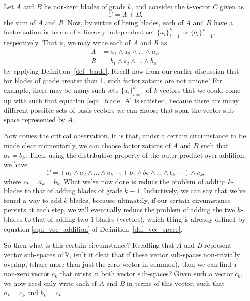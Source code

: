 \documentclass[12pt]{article}
\numberwithin{equation}{section}
\newcommand{\V}{\mathbb{V}}
\begin{document}
Let $A$ and $B$ be non-zero blades of grade $k$, and consider the $k$-vector
$C$ given as
\begin{equation}
C = A + B,
\end{equation}
the sum of $A$ and $B$.  Now, by virtue of being blades, each of
$A$ and $B$ have a factorization in terms of a
linearly independent set $\{a_i\}_{i=1}^k$ or $\{b_i\}_{i=1}^k$,
respectively.  That is, we may write each of $A$ and $B$ as
\begin{align}
A &= a_1\wedge a_2\wedge\dots\wedge a_k, \label{equ_blade_A}\\
B &= b_1\wedge b_2\wedge\dots\wedge b_k,\label{equ_blade_B}
\end{align}
by applying Definition~\ref{def_blade}.
Recall now from our earlier discussion that for blades of grade greater than 1,
such factorizations are not unique!
For example, there may be many such sets $\{a_i\}_{i=1}^k$ of $k$ vectors
that we could come up with such that equation \eqref{equ_blade_A} is satisfied,
because there are many different possible sets of basis vectors we can choose that
span the vector sub-space represented by $A$.

Now comes the critical observation.  It is that, under a certain circumstance to
be made clear momentarily, we
can choose factorizations of $A$ and $B$ such that $a_k=b_k$.  Then, using
the distributive property of the outer product over addition, we have
\begin{equation}
C = (a_1\wedge a_2\wedge\dots\wedge a_{k-1}+b_1\wedge b_2\wedge\dots\wedge b_{k-1})\wedge c_k,
\end{equation}
where $c_k=a_k=b_k$.  What we've now done is reduce the problem of adding
$k$-blades to that of adding blades of grade $k-1$.  Inductively, we can say that we've
found a way to add $k$-blades, because ultimately, if our certain circumstance persists at each step,
we will eventually reduce the problem of adding the two $k$-blades to that
of adding two 1-blades (vectors), which thing is already defined by equation
\eqref{equ_vec_addition} of Definition~\ref{def_vec_space}.

So then what is this certain circumstance?  Recalling that $A$ and $B$ represent
vector sub-spaces of $\V$, isn't it clear that if these vector sub-spaces
non-trivially overlap, (share more than just the zero vector in common), then we can find
a non-zero vector $c_k$ that exists in both vector sub-spaces?  Given such a
vector $c_k$, we now need only write each of $A$ and $B$ in terms of this
vector, such that $a_k=c_k$ and $b_k=c_k$.
\end{document}
